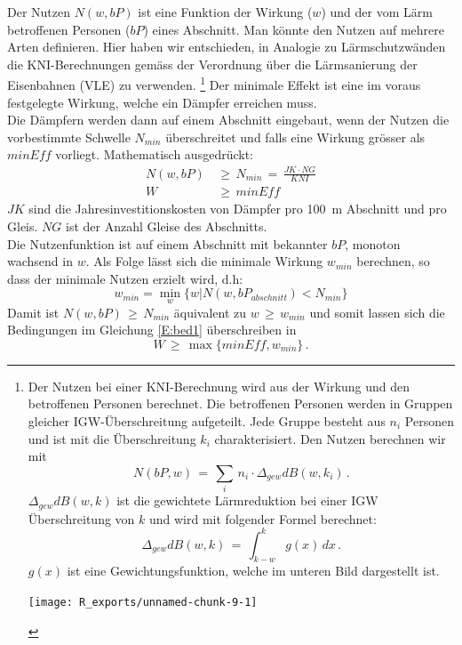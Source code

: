 Der Nutzen $N(w, bP)$ ist eine Funktion der Wirkung ($w$) und der vom Lärm betroffenen Personen ($bP$) eines Abschnitt. Man könnte den Nutzen auf mehrere Arten definieren. Hier haben wir entschieden, in Analogie zu Lärmschutzwänden die KNI-Berechnungen gemäss der Verordnung über die Lärmsanierung der Eisenbahnen (VLE) zu verwenden.  \footnote{
Der Nutzen bei einer KNI-Berechnung wird aus der Wirkung und den betroffenen Personen berechnet. Die betroffenen Personen werden in Gruppen gleicher IGW-Überschreitung aufgeteilt. Jede Gruppe besteht aus $n_i$ Personen und ist mit die Überschreitung $k_i$ charakterisiert. Den Nutzen berechnen wir mit 
\begin{equation*}
	N(bP,w) \,=\,\sum_{i}\,n_i \cdot \Delta_{gew} dB(w,k_i) \, .
\end{equation*} 
$\Delta_{gew} dB(w,k)$ ist die gewichtete Lärmreduktion bei einer IGW Überschreitung von $k$ und wird mit folgender Formel berechnet:
\begin{equation*}
	\Delta_{gew} dB(w,k) \,=\, \int_{k-w}^k g(x)\, dx\,.
\end{equation*}
 $g(x)$ ist eine Gewichtungsfunktion, welche im unteren Bild dargestellt ist.
\begin{center}
\begin{knitrout}
\color{fgcolor}
\texttt{[image: R\_exports/unnamed-chunk-9-1]} 

\end{knitrout}
\end{center}
}
Der minimale Effekt ist eine im voraus festgelegte Wirkung, welche ein Dämpfer erreichen muss.\\

Die Dämpfern werden dann auf einem Abschnitt eingebaut, wenn der Nutzen die vorbestimmte Schwelle $N_{min}$ überschreitet und falls eine Wirkung grösser als $minEff$ vorliegt. Mathematisch ausgedrückt: 
\begin{equation}\label{E:bed1}
	\begin{aligned}
	N(w,bP) \,&\geq\, N_{min}\,=\, \frac{JK\cdot NG}{KNI}\\
	W \,&\geq\, minEff
	\end{aligned}
\end{equation}
$JK$ sind die Jahresinvestitionskosten von Dämpfer pro  \SI{100}{\metre} Abschnitt und pro Gleis.  $NG$ ist der Anzahl Gleise des Abschnitts. \\

Die Nutzenfunktion ist auf einem Abschnitt mit bekannter $bP$,  monoton wachsend in $w$. Als Folge lässt sich die minimale Wirkung $w_{min}$  berechnen, so dass der minimale Nutzen erzielt wird, d.h:
\begin{equation*}
	w_{min}=\min_{w}\{w|N(w,bP_{abschnitt})< N_{min}\}
\end{equation*} 
Damit ist $N(w,bP) \,\geq\, N_{min} $ äquivalent zu $ w \,\geq\,w_{min}$ und somit lassen sich die Bedingungen im Gleichung \ref{E:bed1} überschreiben in
\begin{equation} \label{E:bed2}
 W \,\geq \,\max\{minEff,w_{min}\}\,.
\end{equation}

